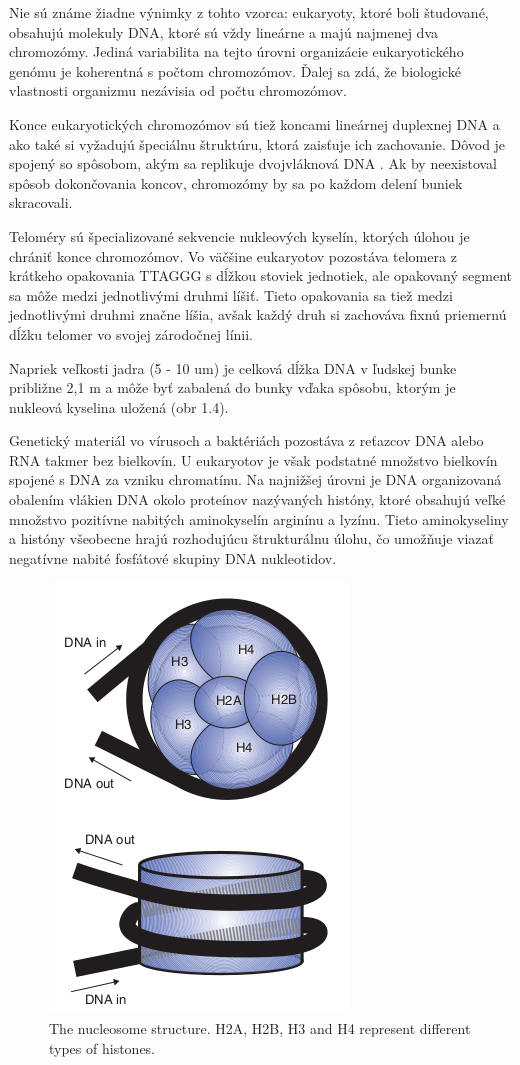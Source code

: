 Nie sú známe žiadne výnimky z tohto vzorca: eukaryoty, ktoré boli študované, obsahujú molekuly DNA, ktoré sú vždy lineárne a majú najmenej dva chromozómy. 
Jediná variabilita na tejto úrovni organizácie eukaryotického genómu je koherentná s počtom chromozómov.
Ďalej sa zdá, že biologické vlastnosti organizmu nezávisia od počtu chromozómov. \cite{Genomes3}

Konce eukaryotických chromozómov sú tiež koncami lineárnej duplexnej DNA a ako také si vyžadujú špeciálnu štruktúru, ktorá zaisťuje ich zachovanie.
Dôvod je spojený so spôsobom, akým sa replikuje dvojvláknová DNA \cite{PrinciplesOfGeneManipulation}.
Ak by neexistoval spôsob dokončovania koncov, chromozómy by sa po každom delení buniek skracovali.

Teloméry sú špecializované sekvencie nukleových kyselín, ktorých úlohou je chrániť konce chromozómov.
Vo väčšine eukaryotov pozostáva telomera z krátkeho opakovania TTAGGG s dĺžkou stoviek jednotiek, ale opakovaný segment sa môže medzi jednotlivými druhmi líšiť.
Tieto opakovania sa tiež medzi jednotlivými druhmi značne líšia, avšak každý druh si zachováva fixnú priemernú dĺžku telomer vo svojej zárodočnej línii.

Napriek veľkosti jadra (5 - 10 um) je celková dĺžka DNA v ľudskej bunke približne 2,1 m a môže byť zabalená do bunky vďaka spôsobu, ktorým je nukleová kyselina uložená (obr 1.4).

Genetický materiál vo vírusoch a baktériách pozostáva z reťazcov DNA alebo RNA takmer bez bielkovín.
U eukaryotov je však podstatné množstvo bielkovín spojené s DNA za vzniku chromatínu.
Na najnižšej úrovni je DNA organizovaná obalením vlákien DNA okolo proteínov nazývaných históny, ktoré obsahujú veľké množstvo pozitívne nabitých aminokyselín arginínu a lyzínu.
Tieto aminokyseliny a históny všeobecne hrajú rozhodujúcu štrukturálnu úlohu, čo umožňuje viazať negatívne nabité fosfátové skupiny DNA nukleotidov.

\begin{figure}[!ht]
	\centering
	\includegraphics[width=.5\textwidth]{figures/nucleoDetailed}
	\caption{The nucleosome structure. H2A, H2B, H3 and H4 represent different types of histones. \label{o:latex_friendly_zone}}
\end{figure}

